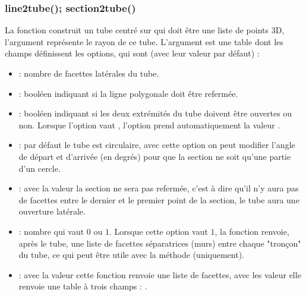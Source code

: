 \subsubsection{line2tube(); section2tube()}

La fonction  construit un tube centré sur  qui doit être une liste de points 3D, l'argument  représente le rayon de ce tube. L'argument  est une table dont les champs définissent les options, qui sont (avec leur valeur  par défaut) :
    \begin{itemize}
        \item {} : nombre de facettes latérales du tube.
        
        \item {} : booléen indiquant si la ligne polygonale doit être refermée.
        
        \item {} : booléen indiquant si les deux extrémités du tube doivent être ouvertes ou non. Lorsque l'option  vaut \true, l'option  prend automatiquement la valeur \true.
        
        \item {} : par défaut le tube est circulaire, avec cette option on peut modifier l'angle de départ et d'arrivée (en degrés) pour que la section ne soit qu'une partie d'un cercle.
        
        \item {} : avec la valeur \true la section ne sera pas refermée, c'est à dire qu'il n'y aura pas de facettes entre le dernier et le premier point de la section, le tube aura une ouverture latérale.
        
        \item {} : nombre qui vaut $0$ ou $1$. Lorsque cette option vaut $1$, la fonction renvoie, après le tube, une liste de facettes séparatrices (murs) entre chaque "tronçon" du tube, ce qui peut être utile avec la méthode  (uniquement).
        
        \item {} : avec la valeur \false cette fonction renvoie une liste de facettes, avec les valeur \true elle renvoie une table à trois champs : .
    \end{itemize}
    
